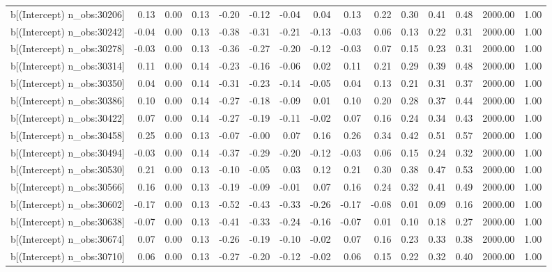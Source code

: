 \begin{table}[ht]
\begin{tabular}{rrrrrrrrrrrrrrr}
  b[(Intercept) n\_obs:30206] & 0.13 & 0.00 & 0.13 & -0.20 & -0.12 & -0.04 & 0.04 & 0.13 & 0.22 & 0.30 & 0.41 & 0.48 & 2000.00 & 1.00 \\ 
  b[(Intercept) n\_obs:30242] & -0.04 & 0.00 & 0.13 & -0.38 & -0.31 & -0.21 & -0.13 & -0.03 & 0.06 & 0.13 & 0.22 & 0.31 & 2000.00 & 1.00 \\ 
  b[(Intercept) n\_obs:30278] & -0.03 & 0.00 & 0.13 & -0.36 & -0.27 & -0.20 & -0.12 & -0.03 & 0.07 & 0.15 & 0.23 & 0.31 & 2000.00 & 1.00 \\ 
  b[(Intercept) n\_obs:30314] & 0.11 & 0.00 & 0.14 & -0.23 & -0.16 & -0.06 & 0.02 & 0.11 & 0.21 & 0.29 & 0.39 & 0.48 & 2000.00 & 1.00 \\ 
  b[(Intercept) n\_obs:30350] & 0.04 & 0.00 & 0.14 & -0.31 & -0.23 & -0.14 & -0.05 & 0.04 & 0.13 & 0.21 & 0.31 & 0.37 & 2000.00 & 1.00 \\ 
  b[(Intercept) n\_obs:30386] & 0.10 & 0.00 & 0.14 & -0.27 & -0.18 & -0.09 & 0.01 & 0.10 & 0.20 & 0.28 & 0.37 & 0.44 & 2000.00 & 1.00 \\ 
  b[(Intercept) n\_obs:30422] & 0.07 & 0.00 & 0.14 & -0.27 & -0.19 & -0.11 & -0.02 & 0.07 & 0.16 & 0.24 & 0.34 & 0.43 & 2000.00 & 1.00 \\ 
  b[(Intercept) n\_obs:30458] & 0.25 & 0.00 & 0.13 & -0.07 & -0.00 & 0.07 & 0.16 & 0.26 & 0.34 & 0.42 & 0.51 & 0.57 & 2000.00 & 1.00 \\ 
  b[(Intercept) n\_obs:30494] & -0.03 & 0.00 & 0.14 & -0.37 & -0.29 & -0.20 & -0.12 & -0.03 & 0.06 & 0.15 & 0.24 & 0.32 & 2000.00 & 1.00 \\ 
  b[(Intercept) n\_obs:30530] & 0.21 & 0.00 & 0.13 & -0.10 & -0.05 & 0.03 & 0.12 & 0.21 & 0.30 & 0.38 & 0.47 & 0.53 & 2000.00 & 1.00 \\ 
  b[(Intercept) n\_obs:30566] & 0.16 & 0.00 & 0.13 & -0.19 & -0.09 & -0.01 & 0.07 & 0.16 & 0.24 & 0.32 & 0.41 & 0.49 & 2000.00 & 1.00 \\ 
  b[(Intercept) n\_obs:30602] & -0.17 & 0.00 & 0.13 & -0.52 & -0.43 & -0.33 & -0.26 & -0.17 & -0.08 & 0.01 & 0.09 & 0.16 & 2000.00 & 1.00 \\ 
  b[(Intercept) n\_obs:30638] & -0.07 & 0.00 & 0.13 & -0.41 & -0.33 & -0.24 & -0.16 & -0.07 & 0.01 & 0.10 & 0.18 & 0.27 & 2000.00 & 1.00 \\ 
  b[(Intercept) n\_obs:30674] & 0.07 & 0.00 & 0.13 & -0.26 & -0.19 & -0.10 & -0.02 & 0.07 & 0.16 & 0.23 & 0.33 & 0.38 & 2000.00 & 1.00 \\ 
  b[(Intercept) n\_obs:30710] & 0.06 & 0.00 & 0.13 & -0.27 & -0.20 & -0.12 & -0.02 & 0.06 & 0.15 & 0.22 & 0.32 & 0.40 & 2000.00 & 1.00 \\ 

\end{tabular}
\end{table}
